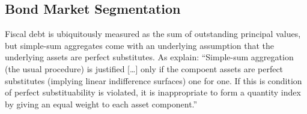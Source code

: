 \documentclass[11pt,a4paper,margin=1.5in]{article}
\begin{document}

\subsection{Bond Market Segmentation}
\label{subsec:MktSeg}
Fiscal debt is ubiquitously measured as the sum of outstanding principal values, but simple-sum aggregates come with an underlying assumption that the underlying assets are perfect substitutes. 
As \citet[pg 431]{Serletis-Robb:1986} explain: ``Simple-sum aggregation (the usual procedure) is justified [\dots] only if the compoent assets are perfect substitutes (implying linear indifference surfaces) one for one.
If this is condition of perfect substituability is violated, it is inappropriate to form a quantity index by giving an equal weight to each asset component.''
\end{document}
